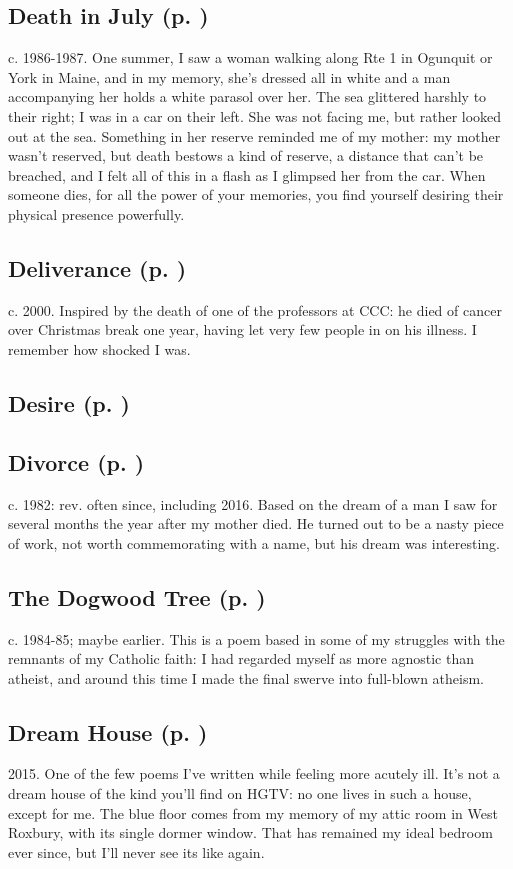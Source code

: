 \subsection*{Death in July (p. \pageref{ch:death_in_july})}
c. 1986-1987. One summer, I saw a woman walking along
Rte 1 in Ogunquit or York in Maine, and in my memory, she's dressed all
in white and a man accompanying her holds a white parasol over her. The
sea glittered harshly to their right; I was in a car on their left. She
was not facing me, but rather looked out at the sea. Something in her
reserve reminded me of my mother: my mother wasn't reserved, but death
bestows a kind of reserve, a distance that can't be breached, and I felt
all of this in a flash as I glimpsed her from the car. When someone
dies, for all the power of your memories, you find yourself desiring
their physical presence powerfully.

\subsection*{Deliverance (p. \pageref{ch:deliverance})}
c. 2000. Inspired by the death of one of the professors
at CCC: he died of cancer over Christmas break one year, having let very
few people in on his illness. I remember how shocked I
was.

\subsection*{Desire (p. \pageref{ch:desire})}

\subsection*{Divorce (p. \pageref{ch:divorce})}
c. 1982: rev. often since, including 2016. Based on the dream of a man I saw for several months the year after my mother died.
He turned out to be a nasty piece of work, not worth commemorating with
a name, but his dream was interesting.

\subsection*{The Dogwood Tree (p. \pageref{ch:dogwood_tree})}
c. 1984-85; maybe earlier. This is a poem based in some
of my struggles with the remnants of my Catholic faith: I had regarded
myself as more agnostic than atheist, and around this time I made the
final swerve into full-blown atheism.

\subsection*{Dream House (p. \pageref{ch:dream_house})}
2015. One of the few poems I've written while feeling
more acutely ill. It's not a dream house of the kind you'll find on HGTV: no one lives in such a house, except for me. The blue floor comes from
my memory of my attic room in West Roxbury, with its single dormer
window. That has remained my ideal bedroom ever since, but I'll never
see its like again.

